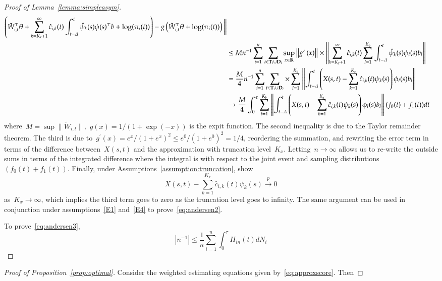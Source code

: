 \documentclass[11pt]{amsart}
\def\bfT{{\bf T}}
\def\bfD{{\bf D}}
\begin{document}
\begin{proof}[Proof of Lemma~\ref{lemma:simpleasym}]
\begin{align*}
         \left( \tilde W_{i,t}^\top \theta  + \sum_{k=K_x+1}^\infty \hat
         c_{i,k} (t) \int_{t-\Delta}^t \hat \psi_k (s) \phi (s)^\top b
         + \log (\pi_i (t) ) \right) - g \left( \tilde W_{i,t}^\top
         \theta + \log (\pi_i (t)) \right) \bigg \| \\
&\leq M n^{-1} \sum_{i=1}^n \sum_{t \in \bfT_i \cup \bfD_i}
    \sup_{x \in \mathbb{R}} \left \| g^\prime \left( x \right)
  \right\| \times \left \| \sum_{k=K_x+1}^\infty \hat c_{i,k} (t)
  \sum_{l=1}^{K_b} \int_{t-\Delta}^t \hat \psi_k (s) \phi_l (s) b_l
  \right \| \\
&= \frac{M}{4} n^{-1} \sum_{i=1}^n \sum_{t \in \bfT_i \cup \bfD_i}
  \times \sum_{l=1}^{K_b} \left \| \int_{t-\Delta}^t
  \left( X(s,t) - \sum_{k=1}^{K_x} \hat c_{i,k} (t) \psi_k (s) \right)
  \phi_l (s) b_l\right \| \\
&\to \frac{M}{4} \int_0^\tau \sum_{l=1}^{K_b} \left \| \int_{t-\Delta}^t
  \left( X(s,t) - \sum_{k=1}^{K_x} \hat c_{i,k} (t) \psi_k (s) \right)
  \phi_l (s) b_l\right \| (f_0(t) + f_1(t)) dt
\end{align*}
where~$M = \sup \| \tilde W_{i,t} \|$,~$g(x) = 1/(1+\exp(-x))$ is the
expit function.
The second inequality is due to the Taylor remainder theorem.
The third is due to~$g^\prime (x) = e^x/(1+e^x)^2 \leq e^0/(1+e^0)^2 =
1/4$, reordering the summation, and rewriting the error term in terms
of the difference between~$X(s,t)$ and the approximation with
truncation level~$K_x$. Letting~$n \to \infty$ allows us to re-write
the outside sums in terms of the integrated difference where the
integral is with respect to the joint event and sampling distributions~$(f_0(t) + f_1 (t))$. Finally, under Assumptions~\ref{assumption:truncation}, \cite{Park2018} show
\[
X(s,t) - \sum_{k=1}^{K_x} \hat c_{i,k} (t) \psi_k (s) \overset{p}{\to} 0
\]
as~$K_x \to \infty$, which implies the third term goes to zero as the truncation level goes to infinity. The same argument can be used in conjunction under assumptions~\ref{E1} and~\ref{E4} to prove~\eqref{eq:andersen2}.

To prove~\eqref{eq:andersen3},
\[
\left | n^{-1}  \right | \leq \frac{1}{n} \sum_{i=1}^n \int_0^\tau H_{in} (t) dN_i
\]
\end{proof}

\begin{proof}[Proof of Proposition~\ref{prop:optimal}]
Consider the weighted estimating equations given by~\eqref{eq:approxscore}.
Then
\end{proof}
\end{document}
